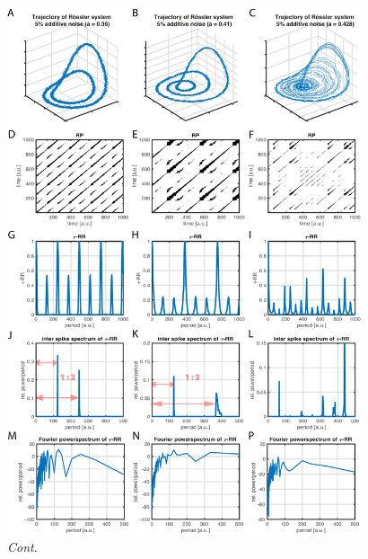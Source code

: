 \documentclass[entropy,article,accept,pdftex,moreauthors]{Definitions/mdpi}
\begin{document}
\begin{figure}[H]
 \includegraphics[width=0.93\textwidth]{./figures/A3A}
 
 \caption{\textit{Cont}.}
\label{fig:petit3leaks3D}
\end{figure}
\end{document}
